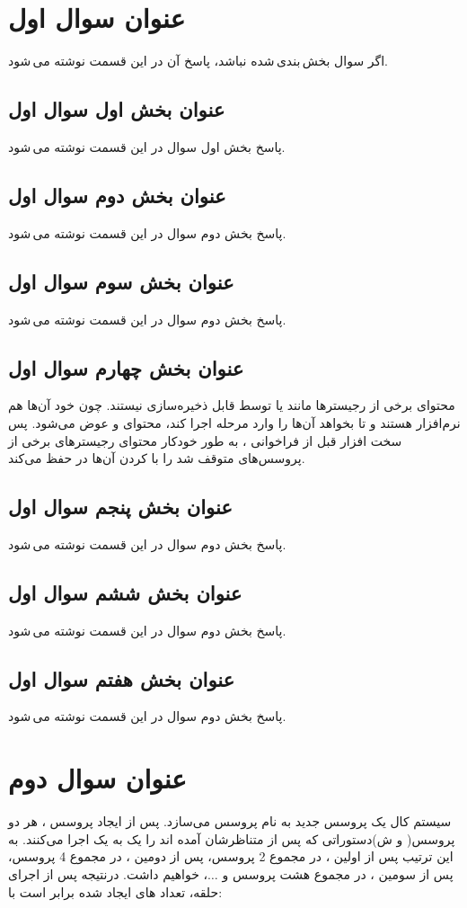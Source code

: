 \documentclass{article}
\begin{document}


\tableofcontents
\newpage

\section{عنوان سوال اول}
اگر سوال بخش\,بندی\,شده نباشد، پاسخ آن در این قسمت نوشته می\,شود.
\subsection{عنوان بخش اول سوال اول}
پاسخ بخش اول سوال در این قسمت نوشته می\,شود.
\subsection{عنوان بخش دوم سوال اول}
پاسخ بخش دوم سوال در این قسمت نوشته می\,شود.
\subsection{عنوان بخش سوم سوال اول}
پاسخ بخش دوم سوال در این قسمت نوشته می\,شود.
\subsection{عنوان بخش چهارم سوال اول}
محتوای برخی از رجیستر‌ها مانند  یا  توسط  قابل ذخیره‌سازی نیستند. چون خود آن‌ها هم نرم‌افزار هستند و تا  بخواهد آن‌ها را وارد مرحله اجرا کند، محتوای  و  عوض می‌شود. پس سخت افزار قبل از فراخوانی  ، به طور خودکار محتوای رجیستر‌های برخی از پروسس‌های متوقف شد را با  کردن آن‌ها در  حفظ می‌کند.
\subsection{عنوان بخش پنجم سوال اول}
پاسخ بخش دوم سوال در این قسمت نوشته می\,شود.
\subsection{عنوان بخش ششم سوال اول}
پاسخ بخش دوم سوال در این قسمت نوشته می\,شود.
\subsection{عنوان بخش هفتم سوال اول}
پاسخ بخش دوم سوال در این قسمت نوشته می\,شود.

\section{عنوان سوال دوم}
\indent
سیستم کال  یک پروسس جدید به نام پروسس  می‌سازد. پس از ایجاد پروسس ، هر دو پروسس( و ش)دستوراتی که پس از  متناظرشان آمده اند را یک به یک اجرا می‌کنند. به این ترتیب پس از اولین ، در مجموع 2 پروسس، پس از دومین ، در مجموع 4 پروسس، پس از سومین ، در مجموع هشت پروسس و $\ldots$، خواهیم داشت. درنتیجه پس از اجرای حلقه، تعداد های ایجاد شده برابر است با:
\end{document}
